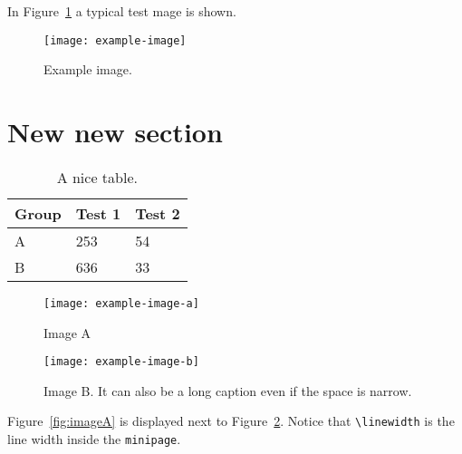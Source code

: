 In Figure~\ref{fig:testfig} a typical test mage is shown.
\begin{figure}[htbp]
  \centering
  \texttt{[image: example-image]}
  \caption{Example image.}
  \label{fig:testfig}
\end{figure}

\section{New new section}
\lipsum[1-2]
\begin{table}[htbp]
  \centering
  \begin{tabular}{lll}
    Group & Test 1 & Test 2\\\hline
    A & 253 &54\\
    B & 636 & 33
  \end{tabular}
  \caption{A nice table.}
  \label{tab:tabletest}
\end{table}

\lipsum[3]
\begin{figure}[htbp]
  \begin{minipage}[t]{0.5\linewidth}
    \centering
    \texttt{[image: example-image-a]}
    \caption{Image A}
    \label{fig:imageA}
  \end{minipage}%
  \begin{minipage}[t]{0.5\linewidth}
    \centering
    \texttt{[image: example-image-b]}
    \caption{Image B. It can also be a long caption even if the space is narrow.}
    \label{fig:imageB}
  \end{minipage}
\end{figure}

Figure~\ref{fig:imageA} is displayed next to Figure~\ref{fig:imageB}. Notice that \verb|\linewidth| is the line width inside the \verb|minipage|.

\lipsum[4]

